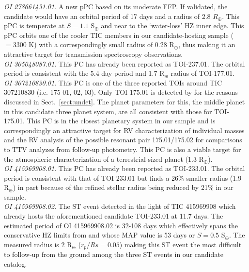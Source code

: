 \emph{OI 278661431.01}. A new pPC based on its moderate FFP. If validated, the candidate
would have an orbital period of 17 days and a radius of 2.8 $R_{\oplus}$. This pPC is temperate
at $S=1.1$ S$_{\oplus}$ and near to the `water-loss' HZ inner edge. This pPC orbits one of the
cooler TIC members in our candidate-hosting sample (\teff{} $=3300$ K) with a correspondingly small
radius of 0.28 R$_{\odot}$, thus making it an attractive target for transmission spectroscopy
observations. \\

\emph{OI 305048087.01}. This PC has already been reported as TOI-237.01. The \pipeline{} orbital
period is consistent with the 5.4 day period and 1.7 R$_{\oplus}$ radius of TOI-177.01. \\

\emph{OI 307210830.01}. This PC is one of the three reported TOIs around TIC 307210830 (i.e. 175-01,
02, 03). Only TOI-175.01 is detected by \pipeline{} for the reasons discussed in Sect.~\ref{sect:undet}.
The \pipeline{} planet parameters for this, the middle planet in this candidate three planet
system, are all consistent with those for TOI-175.01. This PC is in the closest planetary system
in our sample and is correspondingly an attractive target for RV characterization of individual masses
and the RV analysis of the  possible resonant pair 175.01/175.02 for comparisons to TTV analyzes
from follow-up photometry. This PC is also a viable target for the atmospheric characterization of
a terrestrial-sized planet (1.3 R$_{\oplus}$). \\

\emph{OI 415969908.01}. This PC has already been reported as TOI-233.01. The \pipeline{} orbital
period is consistent with that of TOI-233.01 but finds a 26\% smaller radius (1.9 R$_{\oplus}$)
in part because of the refined stellar radius being reduced by 21\% in our sample. \\

\emph{OI 415969908.02}. The ST event detected in the light of TIC 415969908 which already
hosts the aforementioned candidate TOI-233.01 at 11.7 days. The estimated period of OI 415969908.02 is 32-108 days
which effectively spans the conservative HZ limits from \cite{kopparapu13} and whose MAP value is
53 days or $S=0.5$ S$_{\oplus}$. The measured radius is 2 R$_{\oplus}$ ($r_p/Rs=0.05$) making this
ST event the most difficult to follow-up from the ground among the three ST events in our candidate
catalog. \\

